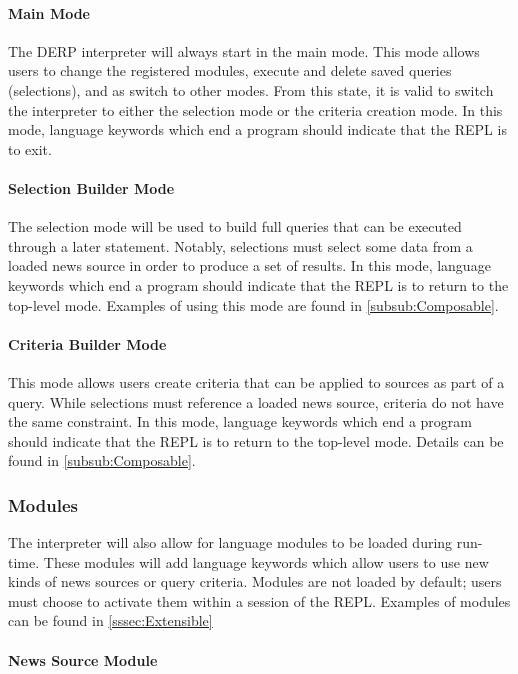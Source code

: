 \paragraph{Main Mode}

The DERP interpreter will always start in the main mode. This mode allows users to change the registered modules, execute and delete saved queries (selections), and as switch to other modes. From this state, it is valid to switch the interpreter to either the selection mode or the criteria creation mode. In this mode, language keywords which end a program should indicate that the REPL is to exit.

\paragraph{Selection Builder Mode}

The selection mode will be used to build full queries that can be executed through a later statement. Notably, selections must select some data from a loaded news source in order to produce a set of results. In this mode, language keywords which end a program should indicate that the REPL is to return to the top-level mode. Examples of using this mode are found in \autoref{subsub:Composable}. 

\paragraph{Criteria Builder Mode}

This mode allows users create criteria that can be applied to sources as part of a query. While selections must reference a loaded news source, criteria do not have the same constraint. In this mode, language keywords which end a program should indicate that the REPL is to return to the top-level mode. Details can be found in \autoref{subsub:Composable}.


\subsubsection{Modules}

The interpreter will also allow for language modules to be loaded during run-time. These modules will add language keywords which allow users to use new kinds of news sources or query criteria. Modules are not loaded by default; users must choose to activate them within a session of the REPL. Examples of modules can be found in \autoref{sssec:Extensible}

\paragraph{News Source Module }

